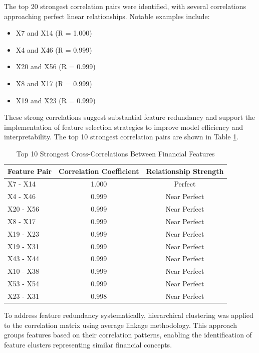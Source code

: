 The top 20 strongest correlation pairs were identified, with several correlations approaching perfect linear relationships. Notable examples include:
\begin{itemize}
    \item X7 and X14 (R = 1.000)
    \item X4 and X46 (R = 0.999)
    \item X20 and X56 (R = 0.999)
    \item X8 and X17 (R = 0.999)
    \item X19 and X23 (R = 0.999)
\end{itemize}

These strong correlations suggest substantial feature redundancy and support the implementation of feature selection strategies to improve model efficiency and interpretability.
The top 10 strongest correlation pairs are shown in Table \ref{tab:correlations}.

\begin{table}[H]
    \centering
    \caption{Top 10 Strongest Cross-Correlations Between Financial Features}
    \label{tab:correlations}
    \begin{tabular}{lcc}
    \toprule
    \textbf{Feature Pair} & \textbf{Correlation Coefficient} & \textbf{Relationship Strength} \\
    \midrule
    X7 - X14 & 1.000 & Perfect \\
    X4 - X46 & 0.999 & Near Perfect \\
    X20 - X56 & 0.999 & Near Perfect \\
    X8 - X17 & 0.999 & Near Perfect \\
    X19 - X23 & 0.999 & Near Perfect \\
    X19 - X31 & 0.999 & Near Perfect \\
    X43 - X44 & 0.999 & Near Perfect \\
    X10 - X38 & 0.999 & Near Perfect \\
    X53 - X54 & 0.999 & Near Perfect \\
    X23 - X31 & 0.998 & Near Perfect \\
    \bottomrule
    \end{tabular}
\end{table}

To address feature redundancy systematically, hierarchical clustering was applied to the correlation matrix using average linkage methodology. This approach groups features based on their correlation patterns, enabling the identification of feature clusters representing similar financial concepts.

